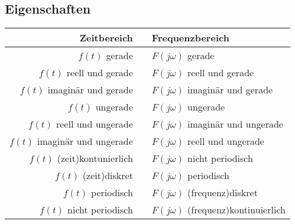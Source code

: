 				
		\subsection{Eigenschaften}
				
					\renewcommand{\arraystretch}{1}					
					\begin{tabular}{rcl}
						\hline 
							\textbf{Zeitbereich} & \laplace  & \textbf{Frequenzbereich} \\ 
						\hline 
						\hline
							$f(t)$ gerade & \laplace & $F(j \omega)$ gerade  \\ 
						\hline 
							$f(t)$ reell und gerade & \laplace & $F(j \omega)$ reell und gerade\\ 
						\hline 
							$f(t)$ imaginär und gerade & \laplace & $F(j \omega)$ imaginär und gerade \\ 
						\hline 
							$f(t)$ ungerade & \laplace & $F(j \omega)$ ungerade \\ 
						\hline 
							$f(t)$ reell und ungerade & \laplace & $F(j \omega)$ imaginär und ungerade \\ 
						\hline 
							$f(t)$ imaginär und ungerade & \laplace & $F(j \omega)$ reell und ungerade\\ 
						\hline 
							$f(t)$ (zeit)kontunierlich & \laplace & $F(j \omega)$ nicht periodisch \\ 
						\hline 
							$f(t)$ (zeit)diskret & \laplace & $F(j \omega)$ periodisch \\ 
						\hline 
							$f(t)$ periodisch & \laplace & $F(j \omega)$ (frequenz)diskret\\ 
						\hline 
							$f(t)$ nicht periodisch & \laplace & $F(j \omega)$ (frequenz)kontinuierlich\\ 
						\hline 
					\end{tabular}
					\renewcommand{\arraystretch}{\arraystretchOriginal}	
					
